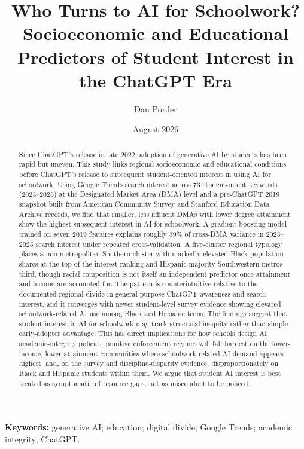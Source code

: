 \documentclass[11pt]{article}
\title{Who Turns to AI for Schoolwork? \\
\large Socioeconomic and Educational Predictors of Student Interest in the ChatGPT Era}
\author[1]{Dan Porder}
\affil[1]{University of London, \texttt{danporder@gmail.com},
ORCID \url{https://orcid.org/0009-0006-4680-011X}}
\date{August 2026}
\begin{document}
\maketitle

\begin{abstract}
\noindent
Since ChatGPT's release in late 2022, adoption of generative AI by students has been rapid but uneven. This study links regional socioeconomic and educational conditions before ChatGPT’s release to subsequent student-oriented interest in using AI for schoolwork. Using Google Trends search interest across 73 student-intent keywords (2023--2025) at the Designated Market Area (DMA) level and a pre-ChatGPT 2019 snapshot built from American Community Survey and Stanford Education Data Archive records, we find that smaller, less affluent DMAs with lower degree attainment show the highest subsequent interest in AI for schoolwork. A gradient boosting model trained on seven 2019 features explains roughly 39\% of cross-DMA variance in 2023--2025 search interest under repeated cross-validation. A five-cluster regional typology places a non-metropolitan Southern cluster with markedly elevated Black population shares at the top of the interest ranking and Hispanic-majority Southwestern metros third, though racial composition is not itself an independent predictor once attainment and income are accounted for. The pattern is counterintuitive relative to the documented regional divide in general-purpose ChatGPT awareness and search interest, and it converges with newer student-level survey evidence showing elevated schoolwork-related AI use among Black and Hispanic teens. The findings suggest that student interest in AI for schoolwork may track structural inequity rather than simple early-adopter advantage. This has direct implications for how schools design AI academic-integrity policies: punitive enforcement regimes will fall hardest on the lower-income, lower-attainment communities where schoolwork-related AI demand appears highest, and, on the survey and discipline-disparity evidence, disproportionately on Black and Hispanic students within them. We argue that student AI interest is best treated as symptomatic of resource gaps, not as misconduct to be policed.
\end{abstract}

\noindent\textbf{Keywords:} generative AI; education; digital divide; Google Trends; academic integrity; ChatGPT.

\end{document}
